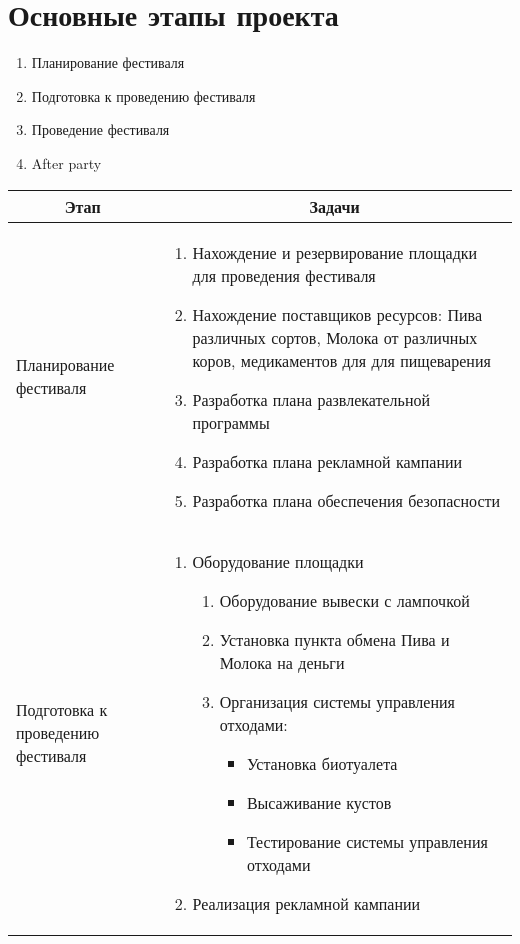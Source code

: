 \documentclass[a4paper,12pt]{article}
\begin{document}
\section{Основные этапы проекта}
\begin{enumerate}
  \item{Планирование фестиваля}
  \item{Подготовка к проведению фестиваля}
  \item{Проведение фестиваля}
  \item{After party}
\end{enumerate}
\begin{center}
\begin{longtable}{|p{3cm}|p{11cm}|}
  \hline
  \multicolumn{1}{|c|}{\textbf{Этап}} & \multicolumn{1}{|c|}{\textbf{Задачи}}\\
  \hline
  \endhead
  Планирование фестиваля & 
  \begin{enumerate}
    \item Нахождение и резервирование площадки для проведения фестиваля
    \item Нахождение поставщиков ресурсов: Пива различных сортов, Молока от различных коров, медикаментов для для пищеварения 
    \item Разработка плана развлекательной программы 
    \item Разработка плана рекламной кампании
    \item Разработка плана обеспечения безопасности
  \end{enumerate} \\
  \hline
  Подготовка к проведению фестиваля & 
  \begin{enumerate}
    \item Оборудование площадки 
      \begin{enumerate}
        \item Оборудование вывески с лампочкой
        \item Установка пункта обмена Пива и Молока на деньги 
        \item Организация системы управления отходами:
          \begin{itemize}
            \item Установка биотуалета
            \item Высаживание кустов
            \item Тестирование системы управления отходами
          \end{itemize}
      \end{enumerate}
    \item Реализация рекламной кампании

\end{enumerate}
\end{longtable}
\end{center}
\end{document}
